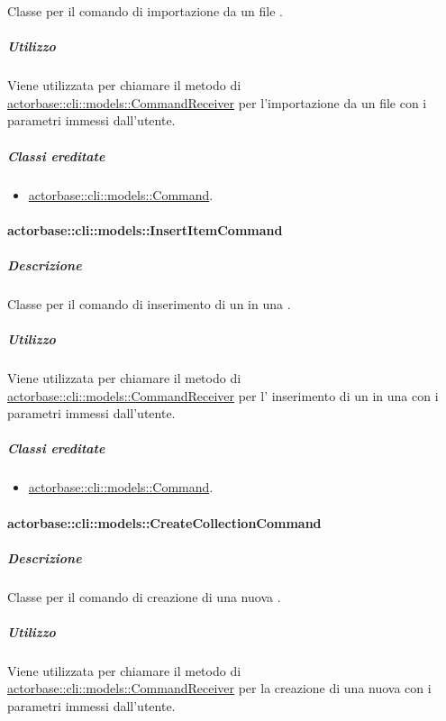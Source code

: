 \documentclass{scalatekids-article}
\begin{document}
Classe per il comando di importazione da un file .

\subparagraph{Utilizzo}

Viene utilizzata per chiamare il metodo di
\hyperref[sec:actorbase::cli::models::CommandReceiver]{actorbase::cli::models::CommandReceiver} per l'importazione da un file
 con i parametri immessi dall'utente.

\subparagraph{Classi ereditate}

\begin{itemize}
\item \hyperref[sec:actorbase::cli::models::Command]{actorbase::cli::models::Command}.
\end{itemize}

\paragraph{actorbase::cli::models::InsertItemCommand}
\label{sec:actorbase::cli::models::InsertItemCommand}

\subparagraph{Descrizione}

Classe per il comando di inserimento di un  in una
.

\subparagraph{Utilizzo}

Viene utilizzata per chiamare il metodo di \hyperref[sec:actorbase::cli::models::CommandReceiver]{actorbase::cli::models::CommandReceiver} per l' inserimento di un  in una  con i parametri immessi dall'utente.

\subparagraph{Classi ereditate}

\begin{itemize}
\item \hyperref[sec:actorbase::cli::models::Command]{actorbase::cli::models::Command}.
\end{itemize}

\paragraph{actorbase::cli::models::CreateCollectionCommand}
\label{sec:actorbase::cli::models::CreateCollectionCommand}

\subparagraph{Descrizione}

Classe per il comando di creazione di una nuova .

\subparagraph{Utilizzo}

Viene utilizzata per chiamare il metodo di
\hyperref[sec:actorbase::cli::models::CommandReceiver]{actorbase::cli::models::CommandReceiver} per la creazione di una nuova
 con i parametri immessi dall'utente.
\end{document}
